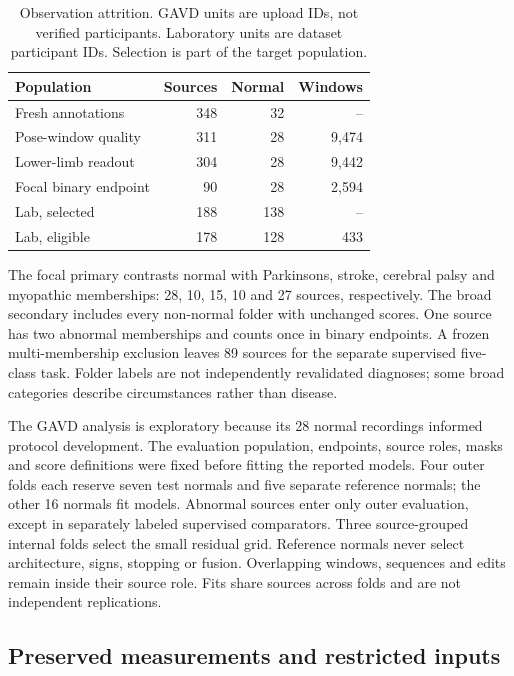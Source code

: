 \documentclass[letterpaper]{article}
\begin{document}
\begin{table}[t]
\centering
\begin{tabular}{lrrr}
\toprule
Population & Sources & Normal & Windows \\
\midrule
Fresh annotations & 348 & 32 & -- \\
Pose-window quality & 311 & 28 & 9,474 \\
Lower-limb readout & 304 & 28 & 9,442 \\
Focal binary endpoint & 90 & 28 & 2,594 \\
Lab, selected & 188 & 138 & -- \\
Lab, eligible & 178 & 128 & 433 \\
\bottomrule
\end{tabular}
\caption{Observation attrition. GAVD units are upload IDs, not verified participants. Laboratory units are dataset participant IDs. Selection is part of the target population.}
\label{tab:attrition}
\end{table}

The focal primary contrasts normal with Parkinsons, stroke, cerebral palsy and myopathic memberships: 28, 10, 15, 10 and 27 sources, respectively. The broad secondary includes every non-normal folder with unchanged scores. One source has two abnormal memberships and counts once in binary endpoints. A frozen multi-membership exclusion leaves 89 sources for the separate supervised five-class task. Folder labels are not independently revalidated diagnoses; some broad categories describe circumstances rather than disease.

The GAVD analysis is exploratory because its 28 normal recordings informed protocol development. The evaluation population, endpoints, source roles, masks and score definitions were fixed before fitting the reported models. Four outer folds each reserve seven test normals and five separate reference normals; the other 16 normals fit models. Abnormal sources enter only outer evaluation, except in separately labeled supervised comparators. Three source-grouped internal folds select the small residual grid. Reference normals never select architecture, signs, stopping or fusion. Overlapping windows, sequences and edits remain inside their source role. Fits share sources across folds and are not independent replications.

\subsection{Preserved measurements and restricted inputs}
\end{document}
